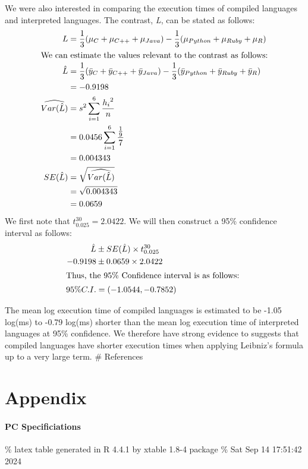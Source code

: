 \documentclass[12pt,halfline,a4paper,]{ouparticle}
\begin{document}
We were also interested in comparing the execution times of compiled
languages and interpreted languages. The contrast, \emph{L}, can be
stated as follows: \begin{align*}
L &= \frac{1}{3} (\mu_C + \mu_{C++} + \mu_{Java}) - \frac{1}{3}(\mu_{Python} + \mu_{Ruby} + \mu_{R})\\
\intertext{We can estimate the values relevant to the contrast as follows:}
\hat{L} &= \frac{1}{3} (\bar{y}_C + \bar{y}_{C++} + \bar{y}_{Java}) - \frac{1}{3}(\bar{y}_{Python} + \bar{y}_{Ruby} + \bar{y}_{R})\\
&= -0.9198 \\
\widehat{Var(\hat{L})} &= s^{2} \sum_{i=1}^{6} \frac{{h_i}^2}{n}\\
&= 0.0456\sum_{i=1}^{6}\frac{\frac{1}{9}}{7}\\
&= 0.004343\\
SE(\hat{L}) &= \sqrt{\widehat{Var(\hat{L})}}\\
 &= \sqrt{0.004343}\\
 &= 0.0659
\end{align*} We first note that \(t_{0.025}^{30} = 2.0422\). We will
then construct a 95\% confidence interval as follows: \begin{align*}
\hat{L}&\pm SE(\hat{L})\times t_{0.025}^{30}\\
-0.9198 &\pm 0.0659 \times 2.0422\\
\intertext{Thus, the 95\% Confidence interval is as follows: }
95\%C.I. &= (-1.0544 ,-0.7852)
\end{align*}

The mean log execution time of compiled languages is estimated to be
-1.05 log(ms) to -0.79 log(ms) shorter than the mean log execution time
of interpreted languages at 95\% confidence. We therefore have strong
evidence to suggests that compiled languages have shorter execution
times when applying Leibniz's formula up to a very large term. \#
References

\newpage

\section{Appendix}\label{appendix}

\paragraph{PC Specificiations}\label{pc-specificiations}

\hfill\break
\% latex table generated in R 4.4.1 by xtable 1.8-4 package \% Sat Sep
14 17:51:42 2024
\end{document}
